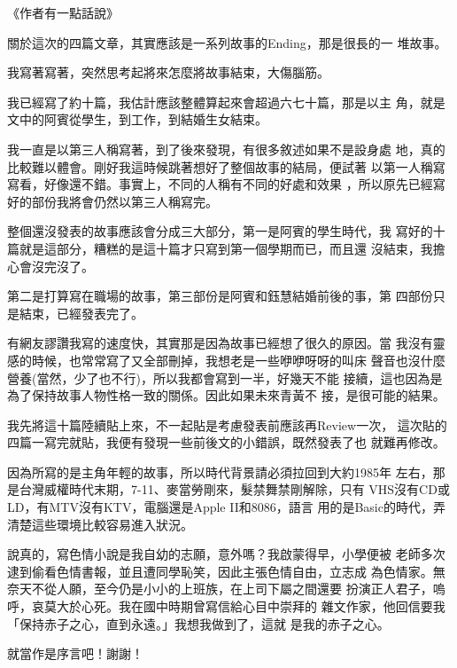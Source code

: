 《作者有一點話說》

關於這次的四篇文章，其實應該是一系列故事的Ending，那是很長的一
堆故事。

我寫著寫著，突然思考起將來怎麼將故事結束，大傷腦筋。

我已經寫了約十篇，我估計應該整體算起來會超過六七十篇，那是以主
角，就是文中的阿賓從學生，到工作，到結婚生女結束。

我一直是以第三人稱寫著，到了後來發現，有很多敘述如果不是設身處
地，真的比較難以體會。剛好我這時候跳著想好了整個故事的結局，便試著
以第一人稱寫寫看，好像還不錯。事實上，不同的人稱有不同的好處和效果
，所以原先已經寫好的部份我將會仍然以第三人稱寫完。

整個還沒發表的故事應該會分成三大部分，第一是阿賓的學生時代，我
寫好的十篇就是這部分，糟糕的是這十篇才只寫到第一個學期而已，而且還
沒結束，我擔心會沒完沒了。

第二是打算寫在職場的故事，第三部份是阿賓和鈺慧結婚前後的事，第
四部份只是結束，已經發表完了。

有網友謬讚我寫的速度快，其實那是因為故事已經想了很久的原因。當
我沒有靈感的時候，也常常寫了又全部刪掉，我想老是一些咿咿呀呀的叫床
聲音也沒什麼營養(當然，少了也不行)，所以我都會寫到一半，好幾天不能
接續，這也因為是為了保持故事人物性格一致的關係。因此如果未來青黃不
接，是很可能的結果。

我先將這十篇陸續貼上來，不一起貼是考慮發表前應該再Review一次，
這次貼的四篇一寫完就貼，我便有發現一些前後文的小錯誤，既然發表了也
就難再修改。

因為所寫的是主角年輕的故事，所以時代背景請必須拉回到大約1985年
左右，那是台灣威權時代末期，7-11、麥當勞剛來，髮禁舞禁剛解除，只有
VHS沒有CD或LD，有MTV沒有KTV，電腦還是Apple II和8086，語言
用的是Basic的時代，弄清楚這些環境比較容易進入狀況。

說真的，寫色情小說是我自幼的志願，意外嗎？我啟蒙得早，小學便被
老師多次逮到偷看色情書報，並且遭同學恥笑，因此主張色情自由，立志成
為色情家。無奈天不從人願，至今仍是小小的上班族，在上司下屬之間還要
扮演正人君子，嗚呼，哀莫大於心死。我在國中時期曾寫信給心目中崇拜的
雜文作家，他回信要我「保持赤子之心，直到永遠。」我想我做到了，這就
是我的赤子之心。

就當作是序言吧！謝謝！